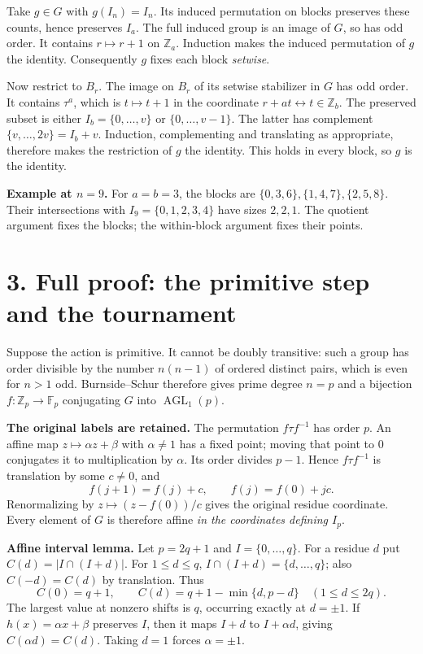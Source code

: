 \documentclass[11pt]{article}
\newcommand{\Z}{\mathbb Z}
\newcommand{\F}{\mathbb F}
\newcommand{\AGL}{\operatorname{AGL}}
\begin{document}
Take $g\in G$ with $g(I_n)=I_n$. Its induced permutation on blocks
preserves these counts, hence preserves $I_a$.
The full induced group is an image of $G$, so has odd order.
It contains $r\mapsto r+1$ on $\Z_a$.
Induction makes the induced permutation of $g$ the identity.
Consequently $g$ fixes each block \emph{setwise}.

Now restrict to $B_r$. The image on $B_r$ of its setwise stabilizer
in $G$ has odd order. It contains $\tau^a$, which is
$t\mapsto t+1$ in the coordinate $r+at\leftrightarrow t\in\Z_b$.
The preserved subset is either $I_b=\{0,\ldots,v\}$ or
$\{0,\ldots,v-1\}$. The latter has complement
$\{v,\ldots,2v\}=I_b+v$. Induction, complementing and translating
as appropriate, therefore makes the restriction of $g$ the identity.
This holds in every block, so $g$ is the identity.

\textbf{Example at $n=9$.} For $a=b=3$, the blocks are
$\{0,3,6\},\{1,4,7\},\{2,5,8\}$. Their intersections with
$I_9=\{0,1,2,3,4\}$ have sizes $2,2,1$. The quotient argument
fixes the blocks; the within-block argument fixes their points.

\newpage
\section*{3. Full proof: the primitive step and the tournament}
Suppose the action is primitive. It cannot be doubly transitive:
such a group has order divisible by the number $n(n-1)$ of ordered
distinct pairs, which is even for $n>1$ odd. Burnside--Schur
therefore gives prime degree $n=p$ and a bijection
$f:\Z_p\to\F_p$ conjugating $G$ into $\AGL_1(p)$.

\textbf{The original labels are retained.} The permutation
$f\tau f^{-1}$ has order $p$. An affine map $z\mapsto\alpha z+\beta$
with $\alpha\neq1$ has a fixed point; moving that point to $0$
conjugates it to multiplication by $\alpha$. Its order divides
$p-1$. Hence $f\tau f^{-1}$ is translation by some $c\neq0$, and
\[
 f(j+1)=f(j)+c,\qquad f(j)=f(0)+jc.
\]
Renormalizing by $z\mapsto(z-f(0))/c$ gives the original residue
coordinate. Every element of $G$ is therefore affine
\emph{in the coordinates defining $I_p$}.

\textbf{Affine interval lemma.} Let $p=2q+1$ and
$I=\{0,\ldots,q\}$. For a residue $d$ put
$C(d)=|I\cap(I+d)|$. For $1\leq d\leq q$,
$I\cap(I+d)=\{d,\ldots,q\}$; also $C(-d)=C(d)$ by translation.
Thus
\[
 C(0)=q+1,\qquad
 C(d)=q+1-\min\{d,p-d\}\quad(1\leq d\leq2q).
\]
The largest value at nonzero shifts is $q$, occurring exactly at
$d=\pm1$. If $h(x)=\alpha x+\beta$ preserves $I$, then it maps
$I+d$ to $I+\alpha d$, giving $C(\alpha d)=C(d)$.
Taking $d=1$ forces $\alpha=\pm1$.
\end{document}
